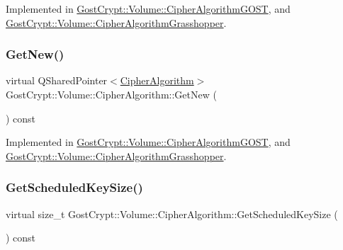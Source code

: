 Implemented in \hyperlink{class_gost_crypt_1_1_volume_1_1_cipher_algorithm_g_o_s_t_a23b0c16c11ee4d10ce2a80bfd64c6fd7}{Gost\+Crypt\+::\+Volume\+::\+Cipher\+Algorithm\+G\+O\+ST}, and \hyperlink{class_gost_crypt_1_1_volume_1_1_cipher_algorithm_grasshopper_a9632d2781e6943683b02ff69766bef0e}{Gost\+Crypt\+::\+Volume\+::\+Cipher\+Algorithm\+Grasshopper}.

\mbox{\label{class_gost_crypt_1_1_volume_1_1_cipher_algorithm_a623a1b2ec1b28d583e432f3915eccfc4}} 
\subsubsection{\texorpdfstring{Get\+New()}{GetNew()}}
{\footnotesize\ttfamily virtual Q\+Shared\+Pointer$<$\hyperlink{class_gost_crypt_1_1_volume_1_1_cipher_algorithm}{Cipher\+Algorithm}$>$ Gost\+Crypt\+::\+Volume\+::\+Cipher\+Algorithm\+::\+Get\+New (\begin{DoxyParamCaption}{ }\end{DoxyParamCaption}) const\hspace{0.3cm}{\ttfamily [pure virtual]}}



Implemented in \hyperlink{class_gost_crypt_1_1_volume_1_1_cipher_algorithm_g_o_s_t_abfef648c71b6819f9b75647f0a291f1b}{Gost\+Crypt\+::\+Volume\+::\+Cipher\+Algorithm\+G\+O\+ST}, and \hyperlink{class_gost_crypt_1_1_volume_1_1_cipher_algorithm_grasshopper_a6760e0603b5af70b2ff697831b1813d0}{Gost\+Crypt\+::\+Volume\+::\+Cipher\+Algorithm\+Grasshopper}.

\mbox{\label{class_gost_crypt_1_1_volume_1_1_cipher_algorithm_a8d39c267bba1bea5b7e51b803d426b9c}} 
\subsubsection{\texorpdfstring{Get\+Scheduled\+Key\+Size()}{GetScheduledKeySize()}}
{\footnotesize\ttfamily virtual size\+\_\+t Gost\+Crypt\+::\+Volume\+::\+Cipher\+Algorithm\+::\+Get\+Scheduled\+Key\+Size (\begin{DoxyParamCaption}{ }\end{DoxyParamCaption}) const\hspace{0.3cm}{\ttfamily [pure virtual]}}



